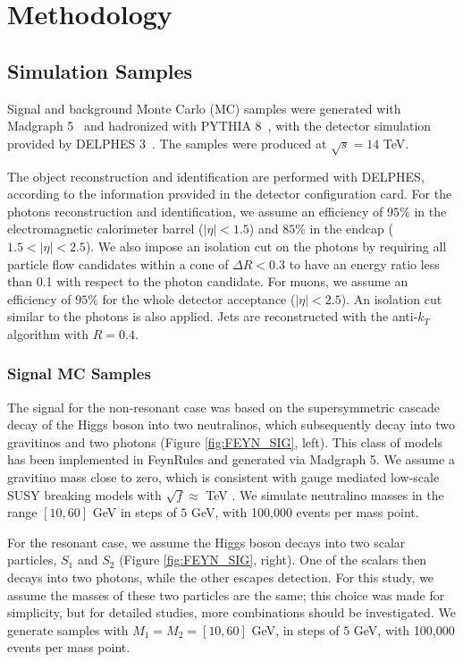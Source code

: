 \documentclass[11pt]{article}
\begin{document}
\section{Methodology}
\subsection{Simulation Samples \label{sub:simulation}}

Signal and background Monte Carlo (MC) samples were generated with Madgraph 5~\cite{madgraph} and hadronized with PYTHIA 8~\cite{pythia}, with the detector simulation provided by DELPHES 3~\cite{delphes}.
The samples were produced at $\sqrt{s} = 14$ TeV.

The object reconstruction and identification are performed with DELPHES, according to the information provided in the detector configuration card. For the photons reconstruction and identification, we assume an efficiency of $95\%$ in the electromagnetic calorimeter barrel ($|\eta| < 1.5$) and $85\%$ in the endcap ($1.5 < |\eta| < 2.5$). We also impose an isolation cut on the photons by requiring all particle flow candidates within a cone of $\Delta R < 0.3$ to have an energy ratio less than 0.1 with respect to the photon candidate. For muons, we assume an efficiency of $95\%$ for the whole detector acceptance ($|\eta| < 2.5$). An isolation cut similar to the photons is also applied. Jets are reconstructed with the anti-$k_T$ algorithm with $R = 0.4$.

\subsubsection{Signal MC Samples}

The signal for the non-resonant case was based on the supersymmetric cascade decay of the Higgs boson into two neutralinos, which subsequently decay into two gravitinos and two photons (Figure \ref{fig:FEYN_SIG}, left). This class of models has been implemented in FeynRules \cite{Christensen:2013aua} and generated via Madgraph 5. We assume a gravitino mass close to zero, which is consistent with gauge mediated low-scale SUSY breaking models with $\sqrt{f} \approx$ TeV \cite{Petersson:2012dp}. We simulate neutralino masses in the range $[10,60]$ GeV in steps of $5$ GeV, with 100,000 events per mass point.

For the resonant case, we assume the Higgs boson decays into two scalar particles, $S_1$ and $S_2$ (Figure \ref{fig:FEYN_SIG}, right). One of the scalars then decays into two photons, while the other escapes detection. For this study, we assume the masses of these two particles are the same; this choice was made for simplicity, but for detailed studies, more combinations should be investigated. We generate samples with $M_{1} = M_{2} = [10,60]$ GeV, in steps of $5$ GeV, with 100,000 events per mass point.
\end{document}
